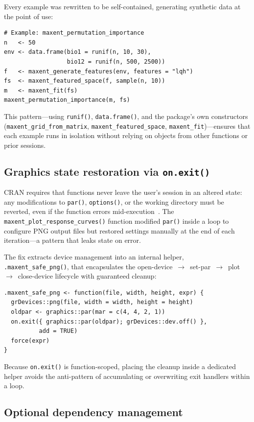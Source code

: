 \documentclass[10pt,letterpaper]{article}
\begin{document}
Every example was rewritten to be self-contained, generating synthetic
data at the point of use:

\begin{verbatim}
# Example: maxent_permutation_importance
n   <- 50
env <- data.frame(bio1 = runif(n, 10, 30),
                  bio12 = runif(n, 500, 2500))
f   <- maxent_generate_features(env, features = "lqh")
fs  <- maxent_featured_space(f, sample(n, 10))
m   <- maxent_fit(fs)
maxent_permutation_importance(m, fs)
\end{verbatim}

This pattern---using \texttt{runif()}, \texttt{data.frame()}, and the
package's own constructors (\texttt{maxent\_grid\_from\_matrix},
\texttt{maxent\_featured\_space},
\texttt{maxent\_fit})---ensures that each example runs in isolation
without relying on objects from other functions or prior sessions.

\subsection*{Graphics state restoration via \texttt{on.exit()}}

CRAN requires that functions never leave the user's session in an
altered state: any modifications to \texttt{par()}, \texttt{options()},
or the working directory must be reverted, even if the function errors
mid-execution~\cite{WRE2024}.
The \texttt{maxent\_plot\_response\_curves()} function modified
\texttt{par()} inside a loop to configure PNG output files but restored
settings manually at the end of each iteration---a pattern that leaks
state on error.

The fix extracts device management into an internal helper,
\texttt{.maxent\_safe\_png()}, that encapsulates the
open-device~$\to$~set-par~$\to$~plot~$\to$~close-device lifecycle with
guaranteed cleanup:

\begin{verbatim}
.maxent_safe_png <- function(file, width, height, expr) {
  grDevices::png(file, width = width, height = height)
  oldpar <- graphics::par(mar = c(4, 4, 2, 1))
  on.exit({ graphics::par(oldpar); grDevices::dev.off() },
          add = TRUE)
  force(expr)
}
\end{verbatim}

Because \texttt{on.exit()} is function-scoped, placing the cleanup
inside a dedicated helper avoids the anti-pattern of accumulating or
overwriting exit handlers within a loop.

\subsection*{Optional dependency management}
\end{document}

